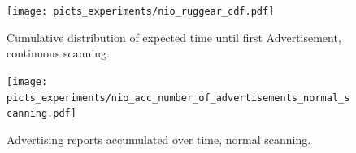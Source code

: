 \documentclass[a4paper,titlepage,oneside,12pt]{amsart} %
\begin{document}
		\begin{figure}[htbp]
		\begin{center}
		 \texttt{[image: picts\_experiments/nio\_ruggear\_cdf.pdf]} 
		\caption{Cumulative distribution of expected time until first Advertisement, continuous scanning.}
		\label{fig:cdfExpectedDelay}
		\end{center}
		\end{figure}
		
		\begin{figure}[htbp]
		\begin{center}
		 \texttt{[image: picts\_experiments/nio\_acc\_number\_of\_advertisements\_normal\_scanning.pdf]} 
		\caption{Advertising reports accumulated over time, normal scanning.}
		\label{fig:accumulatedNormalAds}
		\end{center}
		\end{figure}

\end{document}
